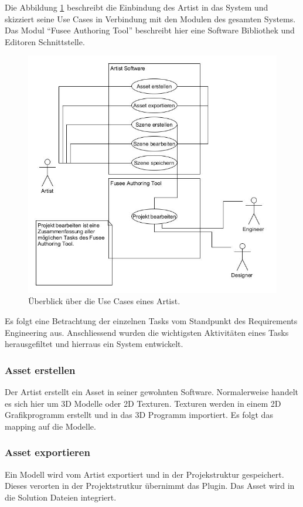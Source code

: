 \documentclass[pagesize, paper=a4, fontsize=12pt, titlepage=true, headings=small, headnosepline, abstractoff, liststotoc, nochapterprefix, plainheadsepline, twoside]{scrreprt}
\begin{document}
Die Abbildung \ref{UseCaseArtist} beschreibt die Einbindung des Artist in das System und skizziert seine Use Cases in Verbindung mit den Modulen des gesamten Systems. Das Modul “Fusee Authoring Tool” beschreibt hier eine Software Bibliothek und Editoren Schnittstelle.
\begin{figure}[ht]
	\centering
	\includegraphics[width=\linewidth]{Bilder/UseCase_Artist.jpg}
	\caption{Überblick über die Use Cases eines Artist.}
	\label{UseCaseArtist}
\end{figure}

Es folgt eine Betrachtung der einzelnen Tasks vom Standpunkt des Requirements Engineering aus. Anschliessend wurden die wichtigsten Aktivitäten eines Tasks herausgefiltet und hierraus ein System entwickelt.

\subsubsection{Asset erstellen}
Der Artist erstellt ein Asset in seiner gewohnten Software. Normalerweise handelt es sich hier um 3D Modelle oder 2D Texturen. Texturen werden in einem 2D Grafikprogramm erstellt und  in das 3D Programm importiert. Es folgt das mapping auf die Modelle.

\subsubsection{Asset exportieren}
Ein Modell wird vom Artist exportiert und in der Projekstruktur gespeichert. Dieses verorten in der Projektstrutkur übernimmt das Plugin. Das Asset wird in die Solution Dateien integriert.
\end{document}
